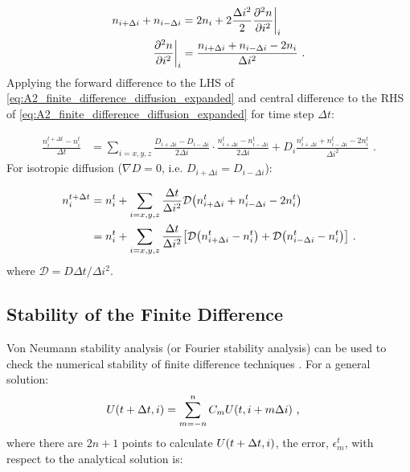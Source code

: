 \begin{equation}
    \begin{aligned}
        n_{i+\Delta i}+n_{i-\Delta i} &=2n_{i} + 2\frac{\Delta i^2}{2}\pdv[2]{n}{i}\bigg|_{i} \\
        \pdv[2]{n}{i} \bigg|_{i}&=\frac{n_{i+\Delta i}+n_{i-\Delta i}-2n_i}{\Delta i^2}\text{ .} 
    \end{aligned}
\end{equation}
\noindent Applying the forward difference to the LHS of \autoref{eq:A2_finite_difference_diffusion_expanded} and central difference to the RHS of \autoref{eq:A2_finite_difference_diffusion_expanded} for time step $\Delta t$:

\begin{equation}
    \begin{aligned}
    \frac{n_i^{t+\Delta t}-n_i^t}{\Delta t}&=\sum_{i=x,y,z}\frac{D_{i+\Delta i}-D_{i-\Delta i}}{2\Delta i}\cdot \frac{n_{i+\Delta i}^t-n_{i-\Delta i}^t}{2\Delta i}+D_i\frac{n_{i+\Delta i}^t+n_{i-\Delta i}^t-2n_i^t}{\Delta i^2}\text{ .} 
    \end{aligned}
\end{equation}
\noindent For isotropic diffusion ($\nabla D=0$, i.e. $D_{i+\Delta i}=D_{i-\Delta i}$):

\begin{equation}
    \begin{aligned}
    n_i^{t+\Delta t}&=n_i^t+\sum_{i=x,y,z}\frac{\Delta t}{\Delta i^2}\mathcal{D}\qty(n_{i+\Delta i}^t+n_{i-\Delta i}^t-2n_i^t) \\
    &=n_i^t+\sum_{i=x,y,z} \frac{\Delta t}{\Delta i^2}\qty[\mathcal{D}\qty(n_{i+\Delta i}^t-n_i^t)+\mathcal{D}\qty(n_{i-\Delta i}^t-n_i^t)]\text{ .} 
    \end{aligned} \label{eq:A2_diffusion_finite_diff}
\end{equation}
\noindent where $\mathcal{D}=D\Delta t/\Delta i^2$. %

\subsection{Stability of the Finite Difference} \label{sec:A2_finite_stability}

Von Neumann stability analysis (or Fourier stability analysis) can be used to check the numerical stability of finite difference techniques \citep{alma9929637001811}. For a general solution:
\begin{equation}
    \begin{aligned}
        U\qty(t+\Delta t, i)&=\sum_{m=-n}^n C_m U\qty(t,i+m\Delta i)\text{ ,} 
    \end{aligned} \label{eq:A3_von_newmann_example}
\end{equation}
\noindent where there are $2n+1$ points to calculate $U\qty(t+\Delta t, i)$, the error, $\epsilon_m^t$, with respect to the analytical solution is:

